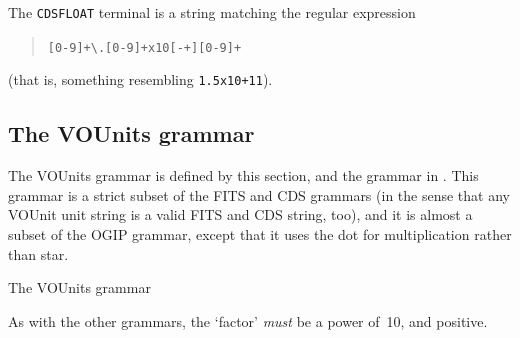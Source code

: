 \documentclass[12pt,notitlepage,onecolumn]{ivoa}
\begin{document}
The \texttt{CDSFLOAT} terminal is a string matching the regular
expression
\begin{quotation}
\texttt{[0-9]+\textbackslash.[0-9]+x10[-+][0-9]+}
\end{quotation}
(that is, something resembling \texttt{1.5x10+11}).




\subsection{The VOUnits grammar}
\label{sec:vougrammar}

The VOUnits grammar is defined by this section, and the grammar in
.
This grammar is a strict subset of the
FITS and CDS grammars (in the sense that any VOUnit unit string is a
valid FITS and CDS string, too), and it is almost a subset of the OGIP
grammar, except that it uses the dot for multiplication rather than
star.

\begin{table}

\caption{\label{tabx:vougrammar}The VOUnits grammar}
\end{table}
As with the other grammars, the `factor'
\emph{must} be a power of~10, and positive.

\clearpage
\end{document}
